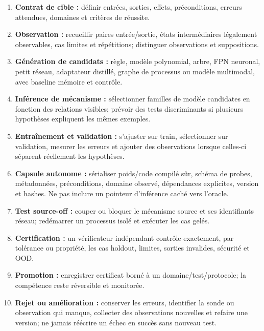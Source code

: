 \documentclass[11pt,a4paper]{report}
\begin{document}
\begin{enumerate}[leftmargin=1.6em]
\item \textbf{Contrat de cible :} définir entrées, sorties, effets, préconditions, erreurs attendues, domaines et critères de réussite.
\item \textbf{Observation :} recueillir paires entrée/sortie, états intermédiaires légalement observables, cas limites et répétitions; distinguer observations et suppositions.
\item \textbf{Génération de candidats :} règle, modèle polynomial, arbre, FPN neuronal, petit réseau, adaptateur distillé, graphe de processus ou modèle multimodal, avec baseline mémoire et contrôle.
\item \textbf{Inférence de mécanisme :} sélectionner familles de modèle candidates en fonction des relations visibles; prévoir des tests discriminants si plusieurs hypothèses expliquent les mêmes exemples.
\item \textbf{Entraînement et validation :} s'ajuster sur train, sélectionner sur validation, mesurer les erreurs et ajouter des observations lorsque celles-ci séparent réellement les hypothèses.
\item \textbf{Capsule autonome :} sérialiser poids/code compilé sûr, schéma de probes, métadonnées, préconditions, domaine observé, dépendances explicites, version et hashes. Ne pas inclure un pointeur d'inférence caché vers l'oracle.
\item \textbf{Test source-off :} couper ou bloquer le mécanisme source et ses identifiants réseau; redémarrer un processus isolé et exécuter les cas gelés.
\item \textbf{Certification :} un vérificateur indépendant contrôle exactement, par tolérance ou propriété, les cas holdout, limites, sorties invalides, sécurité et OOD.
\item \textbf{Promotion :} enregistrer certificat borné à un domaine/test/protocole; la compétence reste réversible et monitorée.
\item \textbf{Rejet ou amélioration :} conserver les erreurs, identifier la sonde ou observation qui manque, collecter des observations nouvelles et refaire une version; ne jamais réécrire un échec en succès sans nouveau test.
\end{enumerate}
\end{document}
